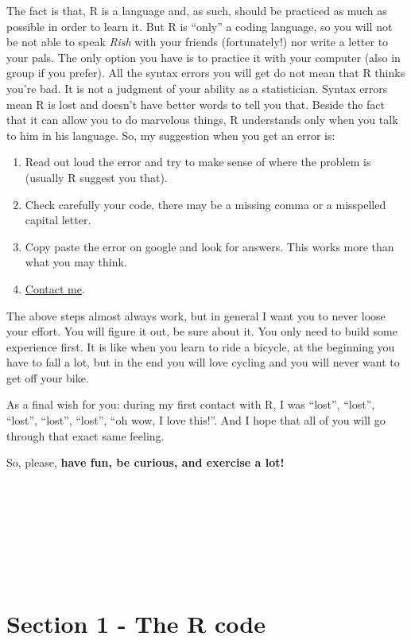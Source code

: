 \documentclass[
]{article}
\begin{document}
The fact is that, R is a language and, as such, should be practiced as
much as possible in order to learn it. But R is ``only'' a coding
language, so you will not be not able to speak \emph{Rish} with your friends
(fortunately!) nor write a letter to your pals. The only option you have
is to practice it with your computer (also in group if you prefer). All
the syntax errors you will get do not mean that R thinks you're bad. It
is not a judgment of your ability as a statistician. Syntax errors mean
R is lost and doesn't have better words to tell you that. Beside the
fact that it can allow you to do marvelous things, R understands only
when you talk to him in his language. So, my suggestion when you get an
error is:

\begin{enumerate}
\def\labelenumi{\arabic{enumi}.}
\item
  Read out loud the error and try to make sense of where the problem
  is (usually R suggest you that).
\item
  Check carefully your code, there may be a missing comma or a
  misspelled capital letter.
\item
  Copy paste the error on google and look for answers. This works more
  than what you may think.
\item
  \href{mailto:info@federicoroscioli.com}{Contact me}.
\end{enumerate}

The above steps almost always work, but in general I want you to never
loose your effort. You will figure it out, be sure about it. You only
need to build some experience first. It is like when you learn to ride a
bicycle, at the beginning you have to fall a lot, but in the end you
will love cycling and you will never want to get off your bike.

As a final wish for you: during my first contact with R, I was ``lost'',
``lost'', ``lost'', ``lost'', ``lost'', ``oh wow, I love this!''. And I hope that
all of you will go through that exact same feeling.

So, please, \textbf{have fun, be curious, and exercise a lot!}

~

~

~

~

\hypertarget{part-section-1---the-r-code}{%
\part{Section 1 - The R code}\label{part-section-1---the-r-code}}
\end{document}
